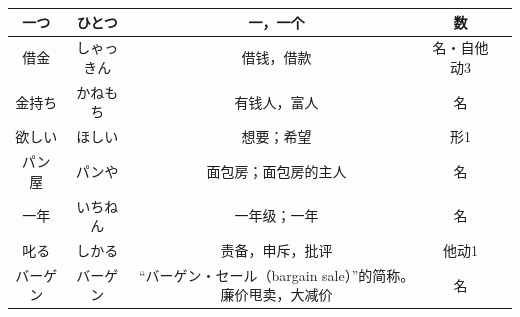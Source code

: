 \begin{longtable}{|c|c|c|c|c|}
一つ & ひとつ & 一，一个 & 数 &  \\ \hline
借金 & しゃっきん & 借钱，借款 & 名・自他动3 &  \\ \hline
金持ち & かねもち & 有钱人，富人 & 名 &  \\ \hline
欲しい & ほしい & 想要；希望 & 形1 &  \\ \hline
パン屋 & パンや & 面包房；面包房的主人 & 名 &  \\ \hline
一年 & いちねん & 一年级；一年 & 名 &  \\ \hline
叱る & しかる & 责备，申斥，批评 & 他动1 &  \\ \hline
バーゲン & バーゲン & “バーゲン・セール（bargain sale）”的简称。廉价甩卖，大减价 & 名 &  \\ \hline
\end{longtable}

